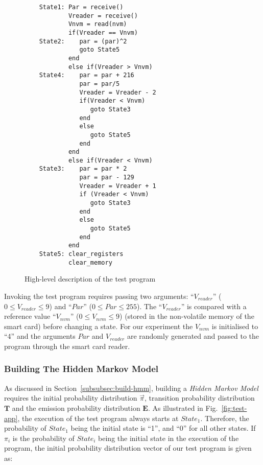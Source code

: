 \documentclass[lnicst]{svmultln}
\begin{document}
\begin{figure*}
\begin{minipage}[h]{0.4\linewidth}
\begin{tikzpicture}
			\end{tikzpicture}
    \end{minipage}
    \hspace{0.5cm}
    \begin{minipage}[h]{0.5\linewidth}
      \caption{High-level description of the test program}\label{verb:hl-desc}
      \centering
      \lstset{basicstyle=\scriptsize,tabsize=2}
			\begin{lstlisting}
    State1: Par = receive()
            Vreader = receive()
            Vnvm = read(nvm)
            if(Vreader == Vnvm)
    State2:    par = (par)^2
               goto State5
            end
            else if(Vreader > Vnvm)
    State4:    par = par + 216
               par = par/5
               Vreader = Vreader - 2
               if(Vreader < Vnvm)
                  goto State3
               end
               else
                  goto State5
               end
            end
            else if(Vreader < Vnvm)
    State3:    par = par * 2
               par = par - 129
               Vreader = Vreader + 1
               if (Vreader < Vnvm)
                  goto State3
               end
               else
                  goto State5
               end
            end
    State5: clear_registers
            clear_memory
				\end{lstlisting}
    \end{minipage}
\end{figure*}

Invoking the test program requires passing two arguments: ``$V_{reader}$'' ($0\leq V_{reader}\leq 9$) and ``$Par$'' ($0\leq Par\leq 255$). The ``$V_{reader}$'' is compared with a reference value ``$V_{nvm}$'' ($0\leq V_{nvm}\leq 9$) (stored in the non-volatile memory of the smart card) before changing a state. For our experiment the $V_{nvm}$ is initialised to ``4'' and the arguments $Par$ and $V_{reader}$ are randomly generated and passed to the program through the smart card reader.

\subsubsection{Building The Hidden Markov Model}
\label{subsubsec:exp-hmm}

As discussed in Section~\ref{subsubsec:build-hmm}, building a \emph{Hidden Markov Model} requires the initial probability distribution $\vec{\pi}$, transition probability distribution $\mathbf{T}$ and the emission probability distribution $\mathbf{E}$. As illustrated in Fig.~\ref{fig:test-app}, the execution of the test program always starts at $State_{1}$. Therefore, the probability of $State_{1}$ being the initial state is ``1'', and ``0'' for all other states. If $\pi_{i}$ is the probability of $State_{i}$ being the initial state in the execution of the program, the initial probability distribution vector of our test program is given as:
\end{document}
